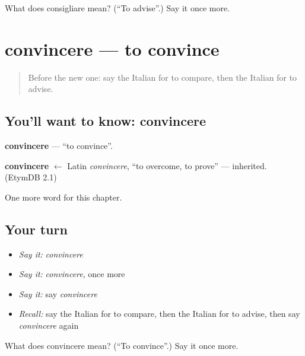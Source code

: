 \begin{tcolorbox}[breakable,colback=teal!4,colframe=teal!35!black,title={Before you move on}]
What does consigliare mean? (\textquotedblleft{}To advise\textquotedblright{}.) Say it once more.
\end{tcolorbox}
\section[convincere]{convincere — to convince}

\label{lesson:IT-C145-convincere}



\begin{quote}
Before the new one: say the Italian for to compare, then the Italian for to advise.
\end{quote}

\subsection*{You'll want to know: convincere}
\textbf{convincere} — \textquotedblleft{}to convince\textquotedblright{}.

\begin{cousinweb}
\textbf{convincere} $\leftarrow$ Latin \emph{convincere}, \textquotedblleft{}to overcome, to prove\textquotedblright{} — inherited. (EtymDB 2.1)
\end{cousinweb}

\begin{grammarlens}[title={What you've built}]
One more word for this chapter.
\end{grammarlens}

\subsection*{Your turn}
\begin{itemize}
\raggedright
  \item \emph{Say it:} \emph{convincere}
  \item \emph{Say it:} \emph{convincere}, once more
  \item \emph{Say it:} say \emph{convincere}
  \item \emph{Recall:} say the Italian for to compare, then the Italian for to advise, then say \emph{convincere} again
\end{itemize}

\begin{tcolorbox}[breakable,colback=teal!4,colframe=teal!35!black,title={Before you move on}]
What does convincere mean? (\textquotedblleft{}To convince\textquotedblright{}.) Say it once more.
\end{tcolorbox}
